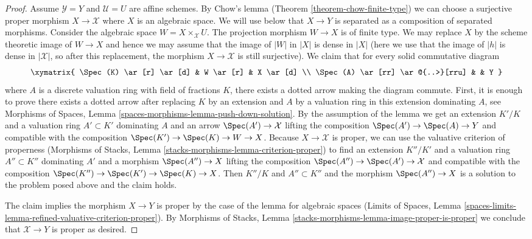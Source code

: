 \begin{proof}
\medskip\noindent
Assume $\mathcal{Y} = Y$ and $\mathcal{U} = U$ are affine schemes.
By Chow's lemma (Theorem \ref{theorem-chow-finite-type})
we can choose a surjective proper morphism $X \to \mathcal{X}$
where $X$ is an algebraic space. We will use below that $X \to Y$ is separated
as a composition of separated morphisms. Consider the
algebraic space $W = X \times_\mathcal{X} U$. The projection morphism
$W \to X$ is of finite type.
We may replace $X$ by the scheme theoretic image of
$W \to X$ and hence we may assume that the image of $|W|$ in $|X|$
is dense in $|X|$ (here we use that the image of $|h|$
is dense in $|\mathcal{X}|$, so after this replacement, the
morphism $X \to \mathcal{X}$ is still surjective).
We claim that for every solid commutative diagram
$$
\xymatrix{
\Spec(K) \ar[r] \ar[d] & W \ar[r] & X \ar[d] \\
\Spec(A) \ar[rr] \ar@{..>}[rru] & & Y
}
$$
where $A$ is a discrete valuation ring with field of fractions $K$, there
exists a dotted arrow making the diagram commute. First, it is enough to
prove there exists a dotted arrow after replacing $K$ by an extension
and $A$ by a valuation ring in this extension dominating $A$, see
Morphisms of Spaces, Lemma \ref{spaces-morphisms-lemma-push-down-solution}.
By the assumption of the lemma we get an extension $K'/K$ and a valuation
ring $A' \subset K'$ dominating $A$ and
an arrow $\Spec(A') \to \mathcal{X}$ lifting the composition
$\Spec(A') \to \Spec(A) \to Y$ and compatible with the composition
$\Spec(K') \to \Spec(K) \to W \to X$. Because $X \to \mathcal{X}$
is proper, we can use the valuative criterion of properness
(Morphisms of Stacks, Lemma \ref{stacks-morphisms-lemma-criterion-proper})
to find an extension $K''/K'$ and a valuation ring $A'' \subset K''$
dominating $A'$ and a morphism $\Spec(A'') \to X$ lifting the composition
$\Spec(A'') \to \Spec(A') \to \mathcal{X}$ and compatible with the composition
$\Spec(K'') \to \Spec(K') \to \Spec(K) \to X$.
Then $K''/K$ and $A'' \subset K''$ and the morphism $\Spec(A'') \to X$
is a solution to the problem posed above and the claim holds.

\medskip\noindent
The claim implies the morphism $X \to Y$ is proper by the
case of the lemma for algebraic spaces
(Limits of Spaces, Lemma
\ref{spaces-limits-lemma-refined-valuative-criterion-proper}).
By Morphisms of Stacks, Lemma
\ref{stacks-morphisms-lemma-image-proper-is-proper}
we conclude that $\mathcal{X} \to Y$ is proper as desired.
\end{proof}

